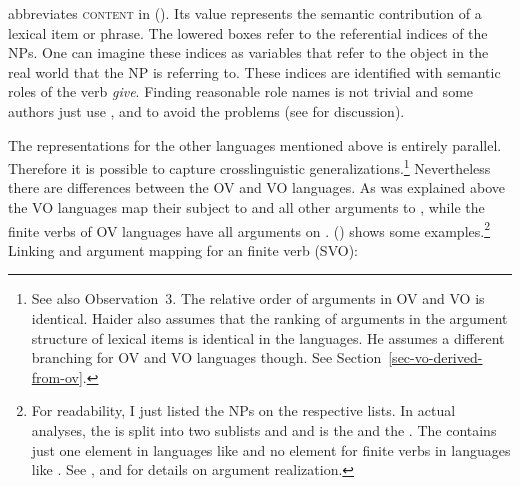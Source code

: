 \label{le-gives}
\z
\cont abbreviates \textsc{content} in (). Its value represents the semantic contribution of a
lexical item or phrase.
The lowered boxes refer to the referential indices of the NPs. One can imagine these indices as
variables that refer to the object in the real world that the NP is referring to. These indices are
identified with semantic roles of the verb \emph{give}. Finding reasonable role names is not trivial
and some authors just use \argone, \argtwo and \argthree to avoid the problems (see \citealp{Dowty91a}
for discussion).

\largerpage%
The representations for the other languages mentioned above is entirely parallel. Therefore it is
possible to capture crosslinguistic generalizations.\footnote{
  See also  Observation~3. The relative order of arguments in OV
  and VO is identical. Haider also assumes that the ranking of arguments in the argument structure
  of lexical items is identical in the  languages. He assumes a different branching for OV
  and VO languages though. See Section~\ref{sec-vo-derived-from-ov}.
} Nevertheless there are differences between the
 OV and VO languages. As was explained above the VO languages map their subject to \spr and
all other arguments to \comps, while the finite verbs of OV languages have all arguments on \comps. 
() shows some examples.\footnote{%
 For readability, I just listed the NPs on the respective lists. In
actual analyses, the \argstl is split into two sublists  and  and  is the
\sprl and  the \compsl. The \sprl contains just one element in languages like  and no
element for finite verbs in languages like .
  See ,  and  for details on argument realization.
}
\eal
\ex Linking and argument mapping for an  finite verb (SVO):\\

